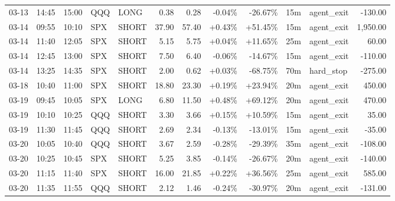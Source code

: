 \documentclass[11pt,a4paper]{article}
\begin{document}
\begin{center}
\begin{longtable}{>{\color{txtmain}}l l l l l r r r r r >{\color{txtmain}}l r}
03-13 & 14:45 & 15:00 & QQQ & LONG & 0.38 & 0.28 & \textcolor{lossred}{-0.04\%} & \textcolor{lossred}{-26.67\%} & 15m & agent\_exit & \textcolor{lossred}{-130.00} \\
03-14 & 09:55 & 10:10 & SPX & SHORT & 37.90 & 57.40 & \textcolor{wingreen}{+0.43\%} & \textcolor{wingreen}{+51.45\%} & 15m & agent\_exit & \textcolor{wingreen}{1,950.00} \\
03-14 & 11:40 & 12:05 & SPX & SHORT & 5.15 & 5.75 & \textcolor{wingreen}{+0.04\%} & \textcolor{wingreen}{+11.65\%} & 25m & agent\_exit & \textcolor{wingreen}{60.00} \\
03-14 & 12:45 & 13:00 & SPX & SHORT & 7.50 & 6.40 & \textcolor{lossred}{-0.06\%} & \textcolor{lossred}{-14.67\%} & 15m & agent\_exit & \textcolor{lossred}{-110.00} \\
03-14 & 13:25 & 14:35 & SPX & SHORT & 2.00 & 0.62 & \textcolor{wingreen}{+0.03\%} & \textcolor{lossred}{-68.75\%} & 70m & hard\_stop & \textcolor{lossred}{-275.00} \\
03-18 & 10:40 & 11:00 & SPX & SHORT & 18.80 & 23.30 & \textcolor{wingreen}{+0.19\%} & \textcolor{wingreen}{+23.94\%} & 20m & agent\_exit & \textcolor{wingreen}{450.00} \\
03-19 & 09:45 & 10:05 & SPX & LONG & 6.80 & 11.50 & \textcolor{wingreen}{+0.48\%} & \textcolor{wingreen}{+69.12\%} & 20m & agent\_exit & \textcolor{wingreen}{470.00} \\
03-19 & 10:10 & 10:25 & QQQ & SHORT & 3.30 & 3.66 & \textcolor{wingreen}{+0.15\%} & \textcolor{wingreen}{+10.59\%} & 15m & agent\_exit & \textcolor{wingreen}{35.00} \\
03-19 & 11:30 & 11:45 & QQQ & SHORT & 2.69 & 2.34 & \textcolor{lossred}{-0.13\%} & \textcolor{lossred}{-13.01\%} & 15m & agent\_exit & \textcolor{lossred}{-35.00} \\
03-20 & 10:05 & 10:40 & QQQ & SHORT & 3.67 & 2.59 & \textcolor{lossred}{-0.28\%} & \textcolor{lossred}{-29.39\%} & 35m & agent\_exit & \textcolor{lossred}{-108.00} \\
03-20 & 10:25 & 10:45 & SPX & SHORT & 5.25 & 3.85 & \textcolor{lossred}{-0.14\%} & \textcolor{lossred}{-26.67\%} & 20m & agent\_exit & \textcolor{lossred}{-140.00} \\
03-20 & 11:15 & 11:40 & SPX & SHORT & 16.00 & 21.85 & \textcolor{wingreen}{+0.22\%} & \textcolor{wingreen}{+36.56\%} & 25m & agent\_exit & \textcolor{wingreen}{585.00} \\
03-20 & 11:35 & 11:55 & QQQ & SHORT & 2.12 & 1.46 & \textcolor{lossred}{-0.24\%} & \textcolor{lossred}{-30.97\%} & 20m & agent\_exit & \textcolor{lossred}{-131.00} \\

\end{longtable}
\end{center}
\end{document}
